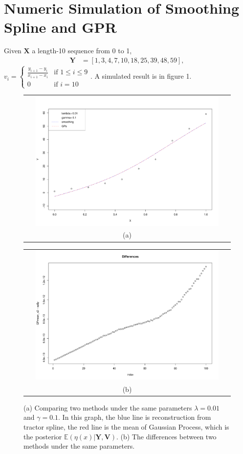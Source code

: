 \section{Numeric Simulation of Smoothing Spline and GPR}
Given $\mathbf{X}$ a length-10 sequence from 0 to 1, 
\begin{align*}
\mathbf{Y}&=\left[1,3,4,7,10,18,25,39,48,59 \right],
\end{align*}
$v_i=\begin{cases}
\frac{y_{i+1}-y_i}{x_{i+1}-x_i}&\mbox{if } 1\leq i \leq 9\\
0 & \mbox{if } i=10
\end{cases}$. 
A simulated result is in figure 1.
\begin{figure}[!htb]  
	\centering
	\begin{tabular}{c}
		\includegraphics[width=12cm,height=7cm]{Chapters/2.TractorSplineTheory/plot/simu01} \\[\abovecaptionskip]
		\small (a) 
	\end{tabular}
	\begin{tabular}{c}
		\includegraphics[width=12cm,height=7cm]{Chapters/2.TractorSplineTheory/plot/simu02} \\[\abovecaptionskip]
		\small (b) 
	\end{tabular}
	\caption{(a) Comparing two methods under the same parameters $\lambda=0.01$ and $\gamma=0.1$. In this graph, the blue line is reconstruction from tractor spline, the red line is the mean of Gaussian Process, which is the posterior $\mathbb{E}(\eta(x) | \mathbf{Y}, \mathbf{V})$. (b) The differences between two methods under the same parameters.}
\end{figure}

